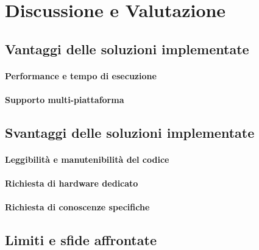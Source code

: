 \lipsum[1]

\section{Discussione e Valutazione}
\label{ch:discussione}

\subsection{Vantaggi delle soluzioni implementate}
\label{subsec:vantaggi}

\lipsum[1]

\paragraph{Performance e tempo di esecuzione}
\label{para:performance}

\lipsum[1]

\paragraph{Supporto multi-piattaforma}
\label{para:supporto}

\lipsum[1]

\subsection{Svantaggi delle soluzioni implementate}
\label{sec:svantaggi}

\lipsum[1]

\paragraph{Leggibilità e manutenibilità del codice}
\label{para:leggibilita}

\lipsum[1]

\paragraph{Richiesta di hardware dedicato}
\label{para:hardware}

\lipsum[1]

\paragraph{Richiesta di conoscenze specifiche}
\label{para:conoscenze}

\lipsum[1]

\subsection{Limiti e sfide affrontate}
\label{subsec:limiti}

\lipsum[1]